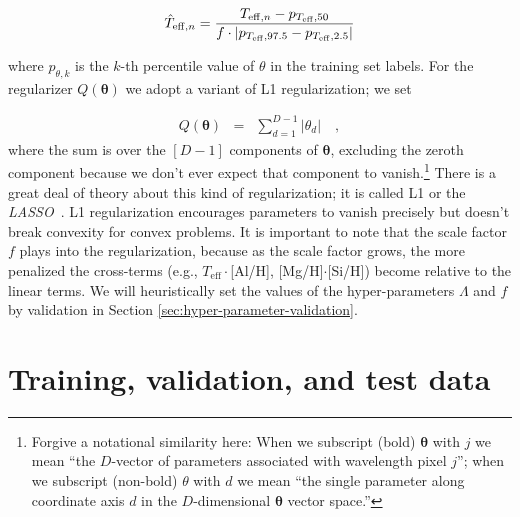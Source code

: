 \documentclass[12pt,preprint]{aastex}
\newcommand{\project}[1]{\textsl{#1}}
\newcommand{\acronym}[1]{{\small{#1}}}
\newcommand{\lasso}{\project{\acronym{LASSO}}}
\newcommand{\Teff}{T_{\mathrm{eff}}}
\newcommand{\Dvector}[1]{\boldsymbol{#1}}
\newcommand{\vectheta}{\Dvector{\theta}}
\begin{document}
\begin{eqnarray}\label{eq:label-norm}
  \hat{T}_{\mathrm{eff},n} = \frac{T_{{\rm eff},n} - p_{\Teff,50}}{f\cdot|p_{\Teff,97.5} - p_{\Teff,2.5}|}
\end{eqnarray}

\noindent{}where $p_{\theta,k}$ is the $k$-th percentile value of $\theta$ in
the training set labels. For the regularizer $Q(\vectheta)$ we adopt a variant
of L1 regularization; we set

\begin{eqnarray}\label{eq:l1-variant}
  Q(\vectheta) &=& \sum_{d=1}^{D-1} |\theta_d|
  \quad,
\end{eqnarray}
where the sum is over the $[D-1]$ components of $\vectheta$, excluding the 
zeroth component because we don't ever expect that component to vanish.\footnote{Forgive a notational similarity here: When we subscript (bold) $\vectheta$ 
with $j$ we mean ``the $D$-vector of parameters associated with wavelength pixel
$j$''; when we subscript (non-bold) $\theta$ with $d$ we mean ``the single parameter along 
coordinate axis $d$ in the $D$-dimensional $\vectheta$ vector space.''} There is
a great deal of theory about this kind of regularization; it is called L1 or the
\lasso\ \citep{Tibshirani_1996}.  L1 regularization encourages parameters to vanish 
precisely but doesn't break convexity for convex problems.  It is important to
note that the scale factor $f$ plays into the regularization, because as the 
scale factor grows, the more penalized the cross-terms (e.g., $\Teff\cdot$[Al/H], [Mg/H]$\cdot$[Si/H]) become 
relative to the linear terms.  We will heuristically set the values of the hyper-parameters
$\Lambda$ and $f$ by validation in Section \ref{sec:hyper-parameter-validation}.


\section{Training, validation, and test data}
\label{sec:training set}
\end{document}
